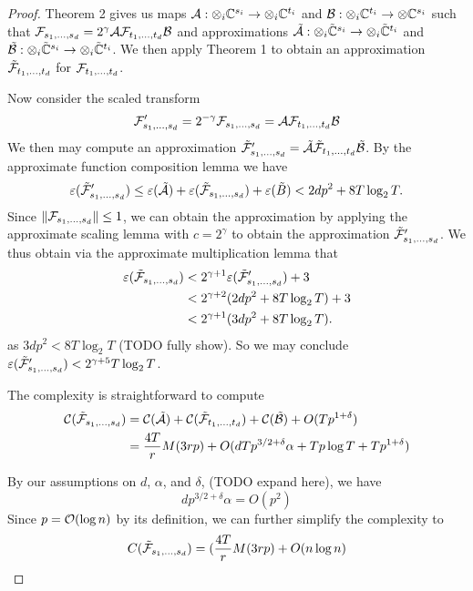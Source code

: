 \begin{proof}
    Theorem 2 gives us maps $\mathcal A: \otimes_i {\mathbb C}^{s_i} \to \otimes_i {\mathbb C}^{t_i}$ and $\mathcal B: \otimes_i {\mathbb C}^{t_i} \to \otimes {\mathbb C}^{s_i}$ such that $\mathcal F_{s_1, \ldots, s_d} = 2^\gamma \mathcal A\mathcal F_{t_1, \ldots, t_d} \mathcal B$ and approximations $\tilde{\mathcal A}: \otimes_i \tilde{{\mathbb C}}^{s_i} \to \otimes_i \tilde{{\mathbb C}}^{t_i}$ and $\tilde{\mathcal B}: \otimes_i \tilde{{\mathbb C}}^{s_i} \to \otimes_i \tilde{{\mathbb C}}^{t_i}$. We then apply Theorem 1 to obtain an approximation $\tilde{\mathcal F}_{t_1, \ldots, t_d}$ for $\mathcal F_{t_1, \ldots, t_d}$.

    Now consider the scaled transform
    \[
        \mathcal F^\prime_{s_1, \ldots, s_d} = 2^{-\gamma} \mathcal F_{s_1, \ldots, s_d} = \mathcal A\mathcal F_{t_1, \ldots, t_d}\mathcal B
    \]
    We then may compute an approximation $\tilde{\mathcal F}^\prime_{s_1, \ldots, s_d} = \tilde{\mathcal A}\tilde{\mathcal F}_{t_1, \ldots, t_d}\tilde{\mathcal B}$. By the approximate function composition lemma we have
    \[
        \varepsilon(\tilde{\mathcal F}^\prime_{s_1, \ldots, s_d}) \le \varepsilon(\tilde{\mathcal A}) + \varepsilon(\tilde{\mathcal F}_{s_1, \ldots, s_d}) + \varepsilon(\tilde{B}) < 2dp^2 + 8T\log_2 T.
    \]
    Since $\|\mathcal F_{s_1, \ldots, s_d}\| \le 1$, we can obtain the approximation by applying the approximate scaling lemma with $c =  2^\gamma$ to obtain the approximation $\tilde{\mathcal F}_{s_1, \ldots, s_d}^\prime$. We thus obtain via the approximate multiplication lemma that
    \begin{align*}
        \varepsilon(\tilde{\mathcal F}_{s_1, \ldots, s_d}) &< 2^{\gamma + 1} \varepsilon(\tilde{\mathcal F}_{s_1, \ldots, s_d}^\prime) + 3\\
                                                      &< 2^{\gamma + 2}(2dp^2 + 8T \log_2 T) + 3\\
                                                      &< 2^{\gamma + 1}(3dp^2 + 8T\log_2 T).
    \end{align*}
    as $3dp^2 < 8T \log_2 T$ (TODO fully show).
    So we may conclude $\varepsilon(\tilde{\mathcal F}_{s_1, \ldots, s_d}^\prime) < 2^{\gamma + 5}T\log_2 T$.

    The complexity is straightforward to compute
    \begin{align*}
        \mathcal C(\tilde{\mathcal F}_{s_1, \ldots, s_d}) &= \mathcal C(\tilde{\mathcal A}) + \mathcal C(\tilde{\mathcal F}_{t_1, \ldots, t_d}) + \mathcal C(\tilde{\mathcal B}) + O(Tp^{1 + \delta})\\
                                                &= \frac{4T}{r}M(3rp) + O(dTp^{3/2 + \delta}\alpha + Tp\log T + Tp^{1 + \delta})
    \end{align*}

    By our assumptions on $d$, $\alpha$, and $\delta$, (TODO expand here), we have
    \[
        dp^{3/2 + \delta}\alpha = O(p^2)
    \]
    Since $p = \mathcal O(\log n)$ by its definition, we can further simplify the complexity to
    \[
        C(\tilde{\mathcal F}_{s_1, \ldots, s_d}) = (\frac{4T}{r}M(3rp) + O(n \log n)
    \]
\end{proof}

